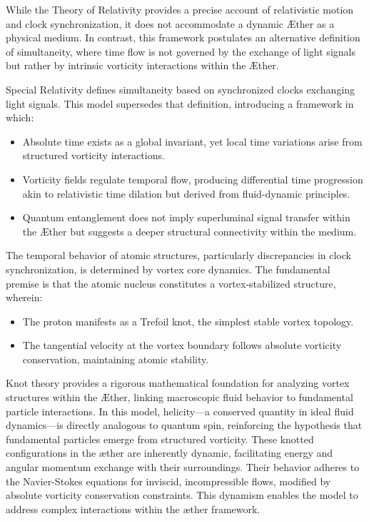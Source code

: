 \documentclass[a4paper,10pt]{article}
\begin{document}
While the Theory of Relativity provides a precise account of relativistic motion and clock synchronization, it does not accommodate a dynamic Æther as a physical medium. In contrast, this framework postulates an alternative definition of simultaneity, where time flow is not governed by the exchange of light signals but rather by intrinsic vorticity interactions within the Æther.

Special Relativity defines simultaneity based on synchronized clocks exchanging light signals. This model supersedes that definition, introducing a framework in which:

\begin{itemize}
    \item Absolute time exists as a global invariant, yet local time variations arise from structured vorticity interactions.
    \item Vorticity fields regulate temporal flow, producing differential time progression akin to relativistic time dilation but derived from fluid-dynamic principles.
    \item Quantum entanglement does not imply superluminal signal transfer within the Æther but suggests a deeper structural connectivity within the medium.
\end{itemize}

The temporal behavior of atomic structures, particularly discrepancies in clock synchronization, is determined by vortex core dynamics. The fundamental premise is that the atomic nucleus constitutes a vortex-stabilized structure, wherein:

\begin{itemize}
    \item The proton manifests as a Trefoil knot, the simplest stable vortex topology.
    \item The tangential velocity at the vortex boundary follows absolute vorticity conservation, maintaining atomic stability.
\end{itemize}

Knot theory provides a rigorous mathematical foundation for analyzing vortex structures within the Æther, linking macroscopic fluid behavior to fundamental particle interactions. In this model, helicity—a conserved quantity in ideal fluid dynamics—is directly analogous to quantum spin, reinforcing the hypothesis that fundamental particles emerge from structured vorticity. These knotted configurations in the æther are inherently dynamic, facilitating energy and angular momentum exchange with their surroundings. Their behavior adheres to the Navier-Stokes equations for inviscid, incompressible flows, modified by absolute vorticity conservation constraints. This dynamism enables the model to address complex interactions within the æther framework.
\end{document}
